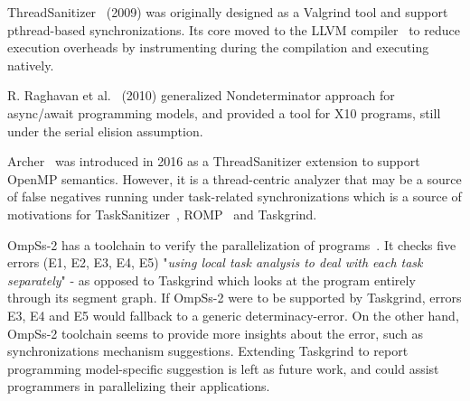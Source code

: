 ThreadSanitizer~\cite{thread-sanitizer-valgrind} (2009) was originally designed as a Valgrind tool and support pthread-based synchronizations.
Its core moved to the LLVM compiler~\cite{tsan-llvm} to reduce execution overheads by instrumenting during the compilation and executing natively.

R. Raghavan et al.~\cite{x10-determinacy-race} (2010) generalized Nondeterminator approach for async/await programming models, and provided a tool for X10 programs, still under the serial elision assumption.

Archer~\cite{archer} was introduced in 2016 as a ThreadSanitizer extension to support OpenMP semantics.
However, it is a thread-centric analyzer that may be a source of false negatives running under task-related synchronizations which is a source of motivations for TaskSanitizer~\cite{Matar18}, ROMP~\cite{ROMP} and Taskgrind.

OmpSs-2 has a toolchain to verify the parallelization of programs~\cite{ompss2-correctness}.
It checks five errors (E1, E2, E3, E4, E5) "\emph{using local task analysis to deal with each task separately}" - as opposed to Taskgrind which looks at the program entirely through its segment graph.
If OmpSs-2 were to be supported by Taskgrind, errors E3, E4 and E5 would fallback to a generic determinacy-error.
On the other hand, OmpSs-2 toolchain seems to provide more insights about the error, such as synchronizations mechanism suggestions.
Extending Taskgrind to report programming model-specific suggestion is left as future work, and could assist programmers in parallelizing their applications.

	   
